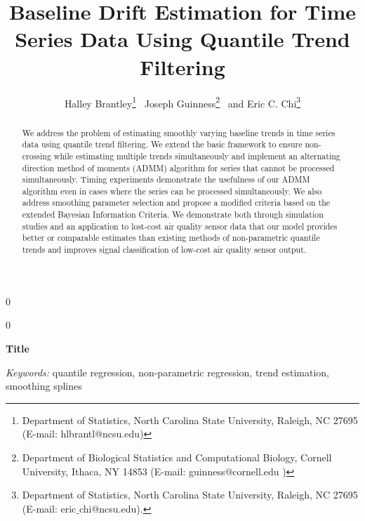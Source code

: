 \documentclass[12pt]{article}
\newcommand{\blind}{0}
\begin{document}
	
	
	\def\spacingset#1{\renewcommand{\baselinestretch}%
		{#1}\small\normalsize} \spacingset{1}
	
	
	
	\blind
	{
		\title{\bf Baseline Drift Estimation for Time Series Data Using Quantile Trend Filtering}
		\author{Halley Brantley\thanks{
				Department of Statistics, North Carolina State University, Raleigh, NC 27695 (E-mail: hlbrantl@ncsu.edu)} \,
			Joseph Guinness\thanks{
				Department of Biological Statistics and Computational Biology, Cornell University, Ithaca, NY 14853 (E-mail: guinness@cornell.edu )} \,
			and
			Eric C. Chi\thanks{Department of Statistics, North Carolina State University, Raleigh, NC 27695 (E-mail: eric$\_$chi@ncsu.edu).}    \\}
		\date{}
		\maketitle
	} \fi
		
	\blind
	{
		\bigskip
		\bigskip
		\bigskip
		\begin{center}
			{\LARGE\bf Title}
		\end{center}
		\medskip
	} \fi
	
	\bigskip
	\begin{abstract}
		We address the problem of estimating smoothly varying baseline trends in time series data using quantile trend filtering. We extend the basic framework to ensure non-crossing while estimating multiple trends simultaneously and implement an alternating direction method of moments (ADMM) algorithm for series that cannot be processed simultaneously. Timing experiments demonstrate the usefulness of our ADMM algorithm even in cases where the series can be processed simultaneously. We also address smoothing parameter selection and propose a modified criteria based on the extended Bayesian Information Criteria. We demonstrate both through simulation studies and an application to lost-cost air quality sensor data that our model provides better or comparable estimates than existing methods of non-parametric quantile trends and improves signal classification of low-cost air quality sensor output. 
	\end{abstract}
	
	\noindent%
	{\it Keywords:} quantile regression, non-parametric regression, trend estimation, smoothing splines
	\vfill
	
\end{document}

